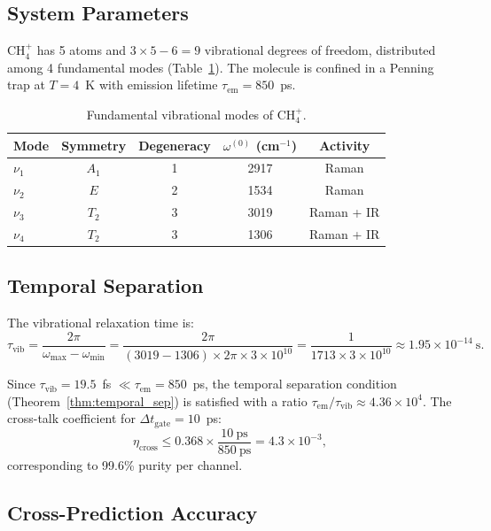 \documentclass[11pt,a4paper]{article}
\theoremstyle{definition}
\theoremstyle{remark}
\begin{document}
\subsection{System Parameters}

CH$_4^+$ has 5 atoms and $3 \times 5 - 6 = 9$ vibrational degrees of freedom, distributed among 4 fundamental modes (Table~\ref{tab:ch4_modes}). The molecule is confined in a Penning trap at $T = 4$~K with emission lifetime $\tau_{\mathrm{em}} = 850$~ps.

\begin{table}[ht]
\centering
\caption{Fundamental vibrational modes of CH$_4^+$.}
\label{tab:ch4_modes}
\begin{tabular}{lcccc}
\toprule
Mode & Symmetry & Degeneracy & $\omega^{(0)}$ (cm$^{-1}$) & Activity \\
\midrule
$\nu_1$ & $A_1$ & 1 & 2917 & Raman \\
$\nu_2$ & $E$   & 2 & 1534 & Raman \\
$\nu_3$ & $T_2$ & 3 & 3019 & Raman + IR \\
$\nu_4$ & $T_2$ & 3 & 1306 & Raman + IR \\
\bottomrule
\end{tabular}
\end{table}

\subsection{Temporal Separation}

The vibrational relaxation time is:
\begin{equation}
\tau_{\mathrm{vib}} = \frac{2\pi}{\omega_{\max} - \omega_{\min}} = \frac{2\pi}{(3019 - 1306) \times 2\pi \times 3 \times 10^{10}} = \frac{1}{1713 \times 3 \times 10^{10}} \approx 1.95 \times 10^{-14}~\mathrm{s}.
\end{equation}

Since $\tau_{\mathrm{vib}} = 19.5$~fs $\ll \tau_{\mathrm{em}} = 850$~ps, the temporal separation condition (Theorem~\ref{thm:temporal_sep}) is satisfied with a ratio $\tau_{\mathrm{em}}/\tau_{\mathrm{vib}} \approx 4.36 \times 10^4$. The cross-talk coefficient for $\Delta t_{\mathrm{gate}} = 10$~ps:
\begin{equation}
\eta_{\mathrm{cross}} \leq 0.368 \times \frac{10~\mathrm{ps}}{850~\mathrm{ps}} = 4.3 \times 10^{-3},
\end{equation}
corresponding to 99.6\% purity per channel.

\subsection{Cross-Prediction Accuracy}
\end{document}

